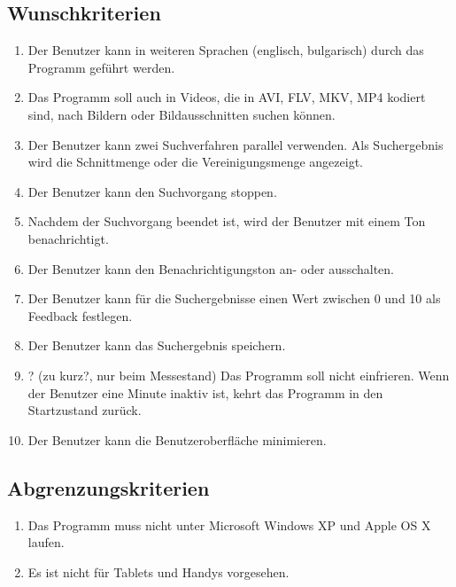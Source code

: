 \subsection{Wunschkriterien}
\begin{enumerate} [label=\bfseries /WK \arabic*0/]
\item Der Benutzer kann in weiteren Sprachen (englisch, bulgarisch) durch das Programm geführt werden.
\item Das Programm soll auch in Videos, die in AVI, FLV, MKV, MP4 kodiert sind, nach Bildern oder Bildausschnitten suchen können.
\item Der Benutzer kann zwei Suchverfahren parallel verwenden. Als Suchergebnis wird die Schnittmenge oder die Vereinigungsmenge angezeigt.
\item Der Benutzer kann den Suchvorgang stoppen.
\item Nachdem der Suchvorgang beendet ist, wird der Benutzer mit einem Ton benachrichtigt.
\item Der Benutzer kann den Benachrichtigungston an- oder ausschalten.
\item Der Benutzer kann für die Suchergebnisse einen Wert zwischen 0 und 10 als Feedback festlegen.
\item Der Benutzer kann das Suchergebnis speichern.
\item ? (zu kurz?, nur beim Messestand) Das Programm soll nicht einfrieren. Wenn der Benutzer eine Minute inaktiv ist, kehrt das Programm in den Startzustand zurück.
\item Der Benutzer kann die Benutzeroberfläche minimieren.  
\end{enumerate}
\subsection{Abgrenzungskriterien}
\begin{enumerate} [label=\bfseries /AK \arabic*0/]
\item Das Programm muss nicht unter Microsoft Windows XP und Apple OS X laufen. 
\item Es ist nicht für Tablets und Handys vorgesehen.
\end{enumerate}
